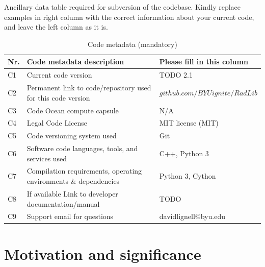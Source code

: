 \documentclass[preprint,12pt, a4paper]{elsarticle}
\begin{document}
Ancillary data table required for subversion of the codebase. Kindly replace examples in right column with the correct information about your current code, and leave the left column as it is.

\begin{table}[H]
\begin{tabular}{|l|p{6.5cm}|p{6.5cm}|}
\hline
\textbf{Nr.} & \textbf{Code metadata description} & \textbf{Please fill in this column} \\
\hline
C1 & Current code version & TODO 2.1 \\
\hline
C2 & Permanent link to code/repository used for this code version & $github.com/BYUignite/RadLib$ \\
\hline
C3 & Code Ocean compute capsule & N/A \\
\hline
C4 & Legal Code License   & MIT license (MIT) \\
\hline
C5 & Code versioning system used & Git \\
\hline
C6 & Software code languages, tools, and services used & C++, Python 3 \\
\hline
C7 & Compilation requirements, operating environments \& dependencies & Python 3, Cython \\
\hline
C8 & If available Link to developer documentation/manual & TODO \\
\hline
C9 & Support email for questions & davidlignell@byu.edu \\
\hline
\end{tabular}
\caption{Code metadata (mandatory)}
\label{} 
\end{table}


\linenumbers


\section{Motivation and significance}
\label{s:motivation}
\end{document}

